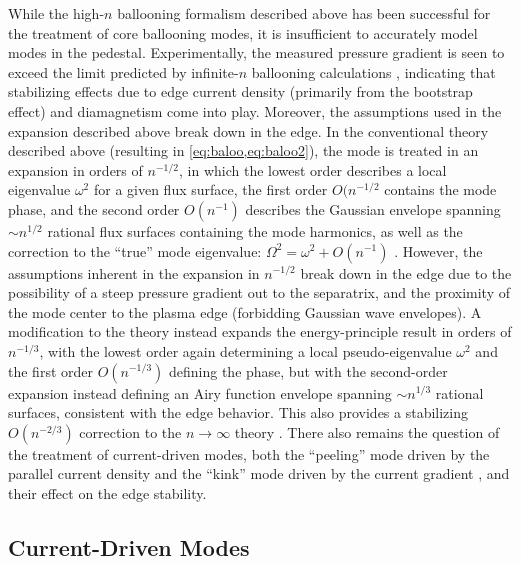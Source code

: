 While the high-$n$ ballooning formalism described above has been successful for the treatment of core ballooning modes, it is insufficient to accurately model modes in the pedestal.  Experimentally, the measured pressure gradient is seen to exceed the limit predicted by infinite-$n$ ballooning calculations \cite{Groebner1998a,Osborne1998}, indicating that stabilizing effects due to edge current density (primarily from the bootstrap effect) and diamagnetism come into play.  Moreover, the assumptions used in the expansion described above break down in the edge.  In the conventional theory \cite{Connor1978,Connor1979} described above (resulting in \cref{eq:baloo,eq:baloo2}), the mode is treated in an expansion in orders of $n^{-1/2}$, in which the lowest order describes a local eigenvalue $\omega^2$ for a given flux surface, the first order $O(n^{-1/2}$ contains the mode phase, and the second order $O(n^{-1})$ describes the Gaussian envelope spanning $\sim n^{1/2}$ rational flux surfaces containing the mode 
harmonics, as well as the correction to the ``true'' mode eigenvalue: $\Omega^2 = \omega^2 + O(n^{-1})$ \cite{Connor1998a,Wilson1999}.  However, the assumptions inherent in the expansion in $n^{-1/2}$ break down in the edge due to the possibility of a steep pressure gradient out to the separatrix, and the proximity of the mode center to the plasma edge (forbidding Gaussian wave envelopes).  A modification to the theory \cite{Connor1998a,Wilson1999} instead expands the energy-principle result in orders of $n^{-1/3}$, with the lowest order again determining a local pseudo-eigenvalue $\omega^2$ and the first order $O(n^{-1/3})$ defining the phase, but with the second-order expansion instead defining an Airy function envelope spanning $\sim n^{1/3}$ rational surfaces, consistent with the edge behavior.  This also provides a stabilizing $O(n^{-2/3})$ correction to the $n \rightarrow \infty$ theory \cite{Connor1998a}.  There also remains the question of the treatment of current-driven modes, both the ``peeling'' 
mode 
driven by the parallel current density and the ``kink'' mode driven by the current gradient \cite{Wilson2006}, and their effect on the edge stability.

\subsection{Current-Driven Modes}\label{subsec:mod_peel}

